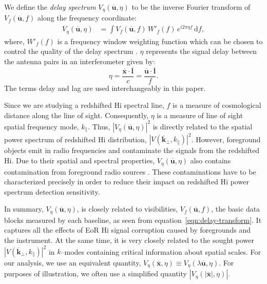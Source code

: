 \documentclass[preprint2,iop,numberedappendix]{emulateapj}
\newcommand{\dif}{\mathrm{d}}
\begin{document}
We define the {\it delay spectrum} $V_\eta(\overline{\mathbf{u}},\eta)$ to be the inverse Fourier transform of $V_f(\overline{\mathbf{u}},f)$ along the frequency coordinate:
\begin{align}\label{eqn:delay-transform}
  V_\eta(\overline{\mathbf{u}},\eta) &= \int V_f(\overline{\mathbf{u}},f)\,W'_f(f)\,e^{i2\pi\eta f}\,\dif f,
\end{align}
where, $W'_f(f)$ is a frequency window weighting function which can be chosen to control the quality of the delay spectrum \citep{thy13,ved12}. $\eta$ represents the signal delay between the antenna pairs in an interferometer given by:
\begin{equation}\label{eqn:delay}
  \eta = \frac{\overline{\mathbf{x}}\cdot\overline{\mathbf{l}}}{c} = \frac{\overline{\mathbf{u}}\cdot\overline{\mathbf{l}}}{f}.
\end{equation}
The terms delay and lag are used interchangeably in this paper.

Since we are studying a redshifted H{\sc i} spectral line, $f$ is a measure of cosmological distance along the line of sight. Consequently, $\eta$ is a measure of line of sight spatial frequency mode, $k_\parallel$. Thus, $|V_\eta(\overline{\mathbf{u}},\eta)|^2$ is directly related to the spatial power spectrum of redshifted H{\sc i} distribution, $|V(\overline{\mathbf{k}}_\perp,k_\parallel)|^2$. However, foreground objects emit in radio frequencies and contaminate the signals from the redshifted H{\sc i}. Due to their spatial and spectral properties, $V_\eta(\overline{\mathbf{u}},\eta)$ also contains contamination from foreground radio sources \citep{thy13,tro12,mor12,bow09}. These contaminations have to be characterized precisely in order to reduce their impact on redshifted H{\sc i} power spectrum detection sensitivity. 

In summary, $V_\eta(\overline{\mathbf{u}},\eta)$, is closely related to visibilities, $V_f(\overline{\mathbf{u}},f)$, the basic data blocks measured by each baseline, as seen from equation~\ref{eqn:delay-transform}. It captures all the effects of EoR H{\sc i} signal corruption caused by foregrounds and the instrument. At the same time, it is very closely related to the sought power $|V(\overline{\mathbf{k}}_\perp,k_\parallel)|^2$ in $k$--modes containing critical information about spatial scales. For our analysis, we use an equivalent quantity, $V_\eta(\overline{\mathbf{x}},\eta) \equiv V_\eta(\lambda\overline{\mathbf{u}},\eta)$. For purposes of illustration, we often use a simplified quantity $|V_\eta(|\overline{\mathbf{x}}|,\eta)|$.
\end{document}
